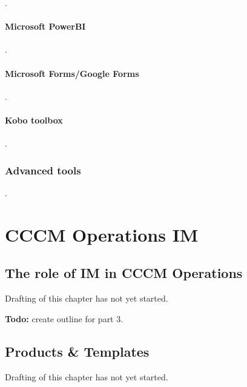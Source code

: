 \documentclass[
  a4paper,
  onecolumn,
  oneside]{book}
\begin{document}
.

\hypertarget{microsoft-powerbi}{%
\subsection{Microsoft PowerBI}\label{microsoft-powerbi}}

.

\hypertarget{microsoft-formsgoogle-forms}{%
\subsection{Microsoft Forms/Google
Forms}\label{microsoft-formsgoogle-forms}}

.

\hypertarget{kobo-toolbox}{%
\subsection{Kobo toolbox}\label{kobo-toolbox}}

.

\hypertarget{advanced-tools}{%
\section{Advanced tools}\label{advanced-tools}}

.

\part{CCCM Operations IM}

\hypertarget{the-role-of-im-in-cccm-operations}{%
\chapter{The role of IM in CCCM
Operations}\label{the-role-of-im-in-cccm-operations}}

Drafting of this chapter has not yet started.

\textbf{Todo:} create outline for part 3.

\hypertarget{products-templates}{%
\chapter{Products \& Templates}\label{products-templates}}

\begin{tcolorbox}[enhanced jigsaw, leftrule=.75mm, arc=.35mm, breakable, toprule=.15mm, opacitybacktitle=0.6, title=\textcolor{quarto-callout-warning-color}{\faExclamationTriangle}\hspace{0.5em}{Warning}, toptitle=1mm, colframe=quarto-callout-warning-color-frame, left=2mm, opacityback=0, rightrule=.15mm, colback=white, coltitle=black, bottomrule=.15mm, colbacktitle=quarto-callout-warning-color!10!white, bottomtitle=1mm, titlerule=0mm]

Drafting of this chapter has not yet started.

\end{tcolorbox}
\end{document}
